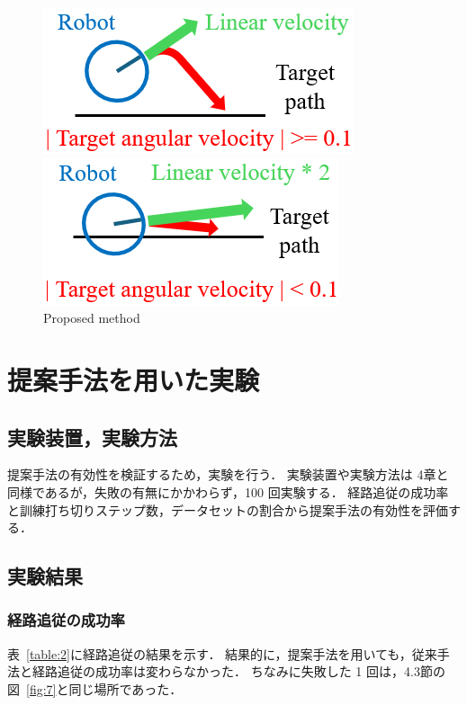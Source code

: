 \documentclass{jarticle}
\renewcommand{\figurename}{図~}
\renewcommand{\tablename}{表~}
\newcommand{\figref}[1]{\figurename\ref{#1}}
\newcommand{\tabref}[1]{\tablename\ref{#1}}
\begin{document}
\begin{figure}[htbp]
  \begin{minipage}[t]{0.5\linewidth}
    \centering
    \includegraphics[keepaspectratio, scale=0.33]{./png/a.png}
  \end{minipage}
  \begin{minipage}[t]{0.5\linewidth}
    \centering
    \includegraphics[keepaspectratio, scale=0.33]{./png/b.png}
  \end{minipage}
  \caption{Proposed method}
  \label{fig:10}
\end{figure}


\section{提案手法を用いた実験}

\subsection{実験装置，実験方法}
提案手法の有効性を検証するため，実験を行う．
実験装置や実験方法は 4章と同様であるが，失敗の有無にかかわらず，100 回実験する．
経路追従の成功率と訓練打ち切りステップ数，データセットの割合から提案手法の有効性を評価する．

\subsection{実験結果}
\subsubsection{経路追従の成功率}
\tabref{table:2}に経路追従の結果を示す．
結果的に，提案手法を用いても，従来手法と経路追従の成功率は変わらなかった．
ちなみに失敗した 1 回は，4.3節の\figref{fig:7}と同じ場所であった．
\end{document}

